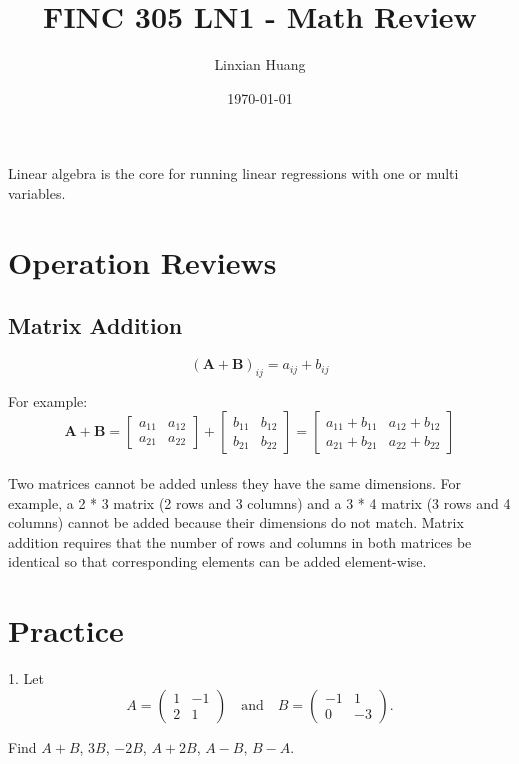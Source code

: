 \documentclass[11pt]{article}
\title{FINC 305 LN1 - Math Review}
\author{Linxian Huang}
\date{\today}
\begin{document}
\maketitle

    Linear algebra is the core for running linear regressions with one or multi variables. \\
\section{Operation Reviews}

    \subsection{Matrix Addition}

    \[
(\mathbf{A} + \mathbf{B})_{ij} = a_{ij} + b_{ij}
\]

For example:
    \[
\mathbf{A} + \mathbf{B} =
\begin{bmatrix}
a_{11} & a_{12} \\
a_{21} & a_{22}
\end{bmatrix}
+
\begin{bmatrix}
b_{11} & b_{12} \\
b_{21} & b_{22}
\end{bmatrix}
=
\begin{bmatrix}
a_{11} + b_{11} & a_{12} + b_{12} \\
a_{21} + b_{21} & a_{22} + b_{22}
\end{bmatrix}
\]
\\
    Two matrices cannot be added unless they have the same dimensions.
For example, a 2 * 3 matrix (2 rows and 3 columns) and a 3 * 4 matrix (3 rows and 4 columns) cannot be added because their dimensions do not match.
    Matrix addition requires that the number of rows and columns in both matrices be identical so that corresponding elements can be added element-wise.


    \section{Practice}
    1. Let
\[
A =
\begin{pmatrix}
1 & -1 \\
2 & 1
\end{pmatrix}
\quad \text{and} \quad
B =
\begin{pmatrix}
-1 & 1 \\
0 & -3
\end{pmatrix}.
\]

Find \( A + B \), \( 3B \), \( -2B \), \( A + 2B \), \( A - B \), \( B - A \).
\end{document}
